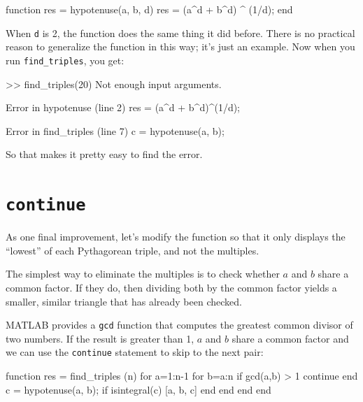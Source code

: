 \documentclass[
]{book}
\numberwithin{Answer}{chapter}
\numberwithin{Exercise}{chapter}
\begin{document}

\begin{code}
function res = hypotenuse(a, b, d)
    res = (a^d + b^d) ^ (1/d);
end
\end{code}

When {\tt d} is 2, the function does the same thing it did before.  There is
no practical reason to generalize the function in this way; it's just
an example.  Now when you run {\tt find\_triples}, you get:

\begin{code}
>> find_triples(20)
Not enough input arguments.

Error in hypotenuse (line 2)
    res = (a^d + b^d)^(1/d);

Error in find_triples (line 7)
            c = hypotenuse(a, b);
\end{code}

So that makes it pretty easy to find the error.  



\section{{\tt continue}}

As one final improvement, let's modify the function so that it only
displays the ``lowest'' of each Pythagorean triple, and not the
multiples.

The simplest way to eliminate the multiples is to check whether
$a$ and $b$ share a common factor.  If they do, then dividing both
by the common factor yields a smaller, similar triangle that has
already been checked.

MATLAB provides a {\tt gcd} function that computes the greatest common
divisor of two numbers.  If the result is greater than 1,
$a$ and $b$ share a common factor and we can use the {\tt continue}
statement to skip to the next pair:

\begin{code}
function res = find_triples (n)
    for a=1:n-1
        for b=a:n
            if gcd(a,b) > 1
                continue
            end
            c = hypotenuse(a, b);
            if isintegral(c)
                [a, b, c]
            end
        end
    end
end
\end{code}
\end{document}
